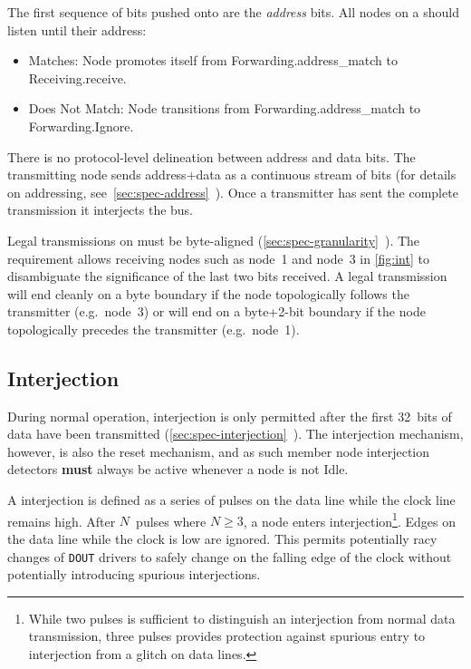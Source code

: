 The first sequence of bits pushed onto \bus are the {\em address} bits. All
nodes on a \bus should listen until their address:
\begin{itemize}
  \item Matches: Node promotes itself from Forwarding.{\sc address\_match} to
    Receiving.{\sc receive}.
  \item Does Not Match: Node transitions from Forwarding.{\sc address\_match}
    to Forwarding.{\sc Ignore}.
\end{itemize}

There is no protocol-level delineation between address and data bits. The
transmitting node sends address$+$data as a continuous stream of bits (for
details on \bus addressing,
see~\ref{sec:spec-address}~). Once a transmitter has
sent the complete transmission it interjects the bus.

Legal transmissions on \bus must be byte-aligned
(\ref{sec:spec-granularity}~). The requirement
allows receiving nodes such as node~1 and node~3 in \cref{fig:int}
to disambiguate the significance of the last two bits received. A legal
transmission will end cleanly on a byte boundary if the node topologically
follows the transmitter (e.g.~node~3) or will end on a byte+2-bit boundary if
the node topologically precedes the transmitter (e.g.~node~1).

\subsection{Interjection}
\label{sec:protocol-interjection}
During normal operation, interjection is only permitted after the first
32~bits of data have been transmitted
(\ref{sec:spec-interjection}~). The
interjection mechanism, however, is also the \bus reset mechanism, and as such
member node interjection detectors {\bf must} always be active whenever a node
is not Idle.

A \bus interjection is defined as a series of pulses on the data line while the
clock line remains high. After $N$~pulses where $N \ge 3$, a node enters
interjection\footnote{
  While two pulses is sufficient to distinguish an interjection from normal
  data transmission, three pulses provides protection against spurious entry
  to interjection from a glitch on data lines.}.
Edges on the data line while the clock is low are ignored. This permits
potentially racy changes of {\tt DOUT} drivers to safely change on the falling
edge of the clock without potentially introducing spurious interjections.

